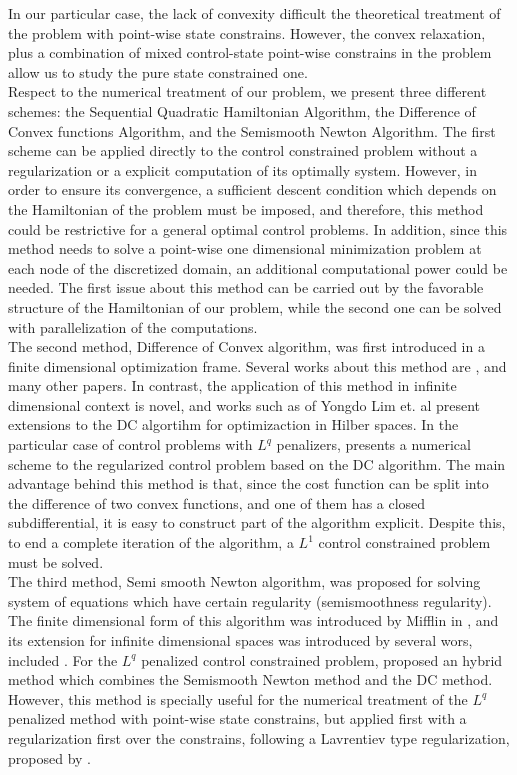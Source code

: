 In our particular case, the lack of convexity difficult the theoretical treatment of the problem with point-wise state constrains. However, the convex relaxation, plus a combination of mixed control-state point-wise constrains in the problem allow us to study the pure state constrained one. \\

Respect to the numerical treatment of our problem, we present three different schemes: the Sequential Quadratic Hamiltonian Algorithm, the Difference of Convex functions Algorithm, and the Semismooth Newton Algorithm. The first scheme can be applied directly to the control constrained problem without a regularization or a explicit computation of its optimally system. However, in order to ensure its convergence, a sufficient descent condition which depends on the Hamiltonian of the problem must be imposed, and therefore, this method could be restrictive for a general optimal control problems. In addition, since this method needs to solve a point-wise one dimensional minimization problem at each node of the discretized domain, an additional computational power could be needed. The first issue about this method can be carried out by the favorable structure of the Hamiltonian of our problem, while the second one can be solved with parallelization of the computations.\\

The second method, Difference of Convex algorithm, was first introduced in a finite dimensional optimization frame. Several works about this method are \cite{dinh, dihn2, dihn3, dinh4}, and many other papers. In contrast, the application of this method in infinite dimensional context is novel, and works such as of Yongdo Lim et. al \cite{yongdo} present extensions to the DC algortihm for optimizaction in Hilber spaces. In the particular case of control problems with $L^q$ penalizers, \cite{merino2019} presents a numerical scheme  to the regularized control problem based on the DC algorithm. The main advantage behind this method is that, since the cost function can be split into the difference of two convex functions, and one of them has a closed subdifferential, it is easy to construct part of the algorithm explicit. Despite this, to end a complete iteration of the algorithm, a $L^1$ control constrained problem must be solved.\\

The third method, Semi smooth Newton algorithm, was proposed for solving system of equations which have certain regularity (semismoothness regularity). The finite dimensional form of this algorithm was introduced by Mifflin in \cite{mifflin}, and its extension for infinite dimensional spaces was introduced by several wors, included \cite{qi, qisun}. For the $L^q$ penalized control constrained problem, \cite{merino2021} proposed an hybrid method which combines the Semismooth Newton method and the DC method. However, this method is specially useful for the numerical treatment of the $L^q$ penalized method with point-wise state constrains, but applied first with a regularization first over the constrains, following a Lavrentiev type regularization, proposed by \cite{meyer-2007}.\\

